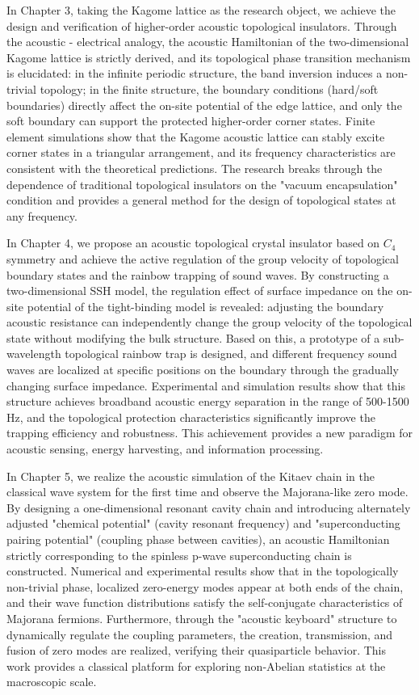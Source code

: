 \documentclass[
    anonymous,              %
    type = doctor,
  ]{njuthesis}
\begin{document}
\begin{abstract*}
  In Chapter 3, taking the Kagome lattice as the research object, we achieve the design and verification of higher-order acoustic topological insulators. Through the acoustic - electrical analogy, the acoustic Hamiltonian of the two-dimensional Kagome lattice is strictly derived, and its topological phase transition mechanism is elucidated: in the infinite periodic structure, the band inversion induces a non-trivial topology; in the finite structure, the boundary conditions (hard/soft boundaries) directly affect the on-site potential of the edge lattice, and only the soft boundary can support the protected higher-order corner states. Finite element simulations show that the Kagome acoustic lattice can stably excite corner states in a triangular arrangement, and its frequency characteristics are consistent with the theoretical predictions. The research breaks through the dependence of traditional topological insulators on the "vacuum encapsulation" condition and provides a general method for the design of topological states at any frequency.
  
  In Chapter 4, we propose an acoustic topological crystal insulator based on $C_4$ symmetry and achieve the active regulation of the group velocity of topological boundary states and the rainbow trapping of sound waves. By constructing a two-dimensional SSH model, the regulation effect of surface impedance on the on-site potential of the tight-binding model is revealed: adjusting the boundary acoustic resistance can independently change the group velocity of the topological state without modifying the bulk structure. Based on this, a prototype of a sub-wavelength topological rainbow trap is designed, and different frequency sound waves are localized at specific positions on the boundary through the gradually changing surface impedance. Experimental and simulation results show that this structure achieves broadband acoustic energy separation in the range of 500-1500 Hz, and the topological protection characteristics significantly improve the trapping efficiency and robustness. This achievement provides a new paradigm for acoustic sensing, energy harvesting, and information processing.
  
  In Chapter 5, we realize the acoustic simulation of the Kitaev chain in the classical wave system for the first time and observe the Majorana-like zero mode. By designing a one-dimensional resonant cavity chain and introducing alternately adjusted "chemical potential" (cavity resonant frequency) and "superconducting pairing potential" (coupling phase between cavities), an acoustic Hamiltonian strictly corresponding to the spinless p-wave superconducting chain is constructed. Numerical and experimental results show that in the topologically non-trivial phase, localized zero-energy modes appear at both ends of the chain, and their wave function distributions satisfy the self-conjugate characteristics of Majorana fermions. Furthermore, through the "acoustic keyboard" structure to dynamically regulate the coupling parameters, the creation, transmission, and fusion of zero modes are realized, verifying their quasiparticle behavior. This work provides a classical platform for exploring non-Abelian statistics at the macroscopic scale.
  

\end{abstract*}
\end{document}
